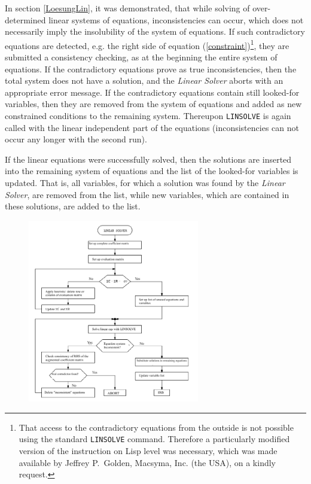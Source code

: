 In section \ref{LoesungLin}, it was demonstrated, that while solving of over-determined linear systems of equations, inconsistencies can occur, which does not necessarily imply the insolubility of the system of equations. If such contradictory equations are detected, e.g. the right side of equation  (\ref{constraint})\footnote{That access to the contradictory equations from the outside is not possible using the standard  {\tt LINSOLVE} command.  Therefore a particularly modified version of the instruction  on Lisp level was necessary, which was made available by Jeffrey P.\ Golden, Macsyma, Inc. (the USA), on a kindly request.}, 
they are submitted a consistency checking, as at the beginning the entire system of equations. If the contradictory equations prove as true inconsistencies, then the total system does not have a solution, and the {\em Linear Solver} aborts with an appropriate error message. If the contradictory equations contain still looked-for variables, then they are removed from the system of equations and added as new constrained  conditions to the remaining system. Thereupon \verb+LINSOLVE+ is again called  with the linear independent part of the equations (inconsistencies can not occur any longer with the second run).

If the linear equations were successfully solved, then the solutions are inserted into the remaining system of equations and the list of the looked-for variables is updated. That is, all variables, for which a solution was found  by the {\em Linear Solver}, are removed from the list, while new variables, which are contained in these solutions, are added to the list.

\clearpage

\begin {figure} [htbp]
\begin {center}
\includegraphics[height=8cm]{LinearEn.png}
\caption {}
\end {center}
\end {figure}

